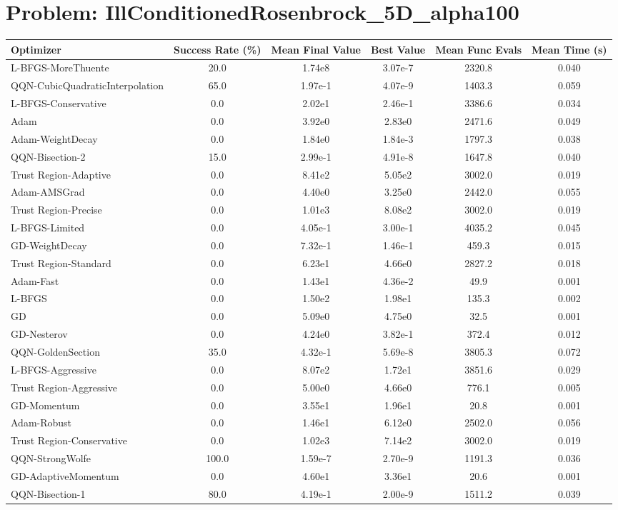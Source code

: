 \documentclass{article}
\begin{document}
\section{Problem: IllConditionedRosenbrock\_5D\_alpha100}
\begin{longtable}{p{3cm}*{5}{c}}
\toprule
\textbf{Optimizer} & \textbf{Success Rate (\%)} & \textbf{Mean Final Value} & \textbf{Best Value} & \textbf{Mean Func Evals} & \textbf{Mean Time (s)} \\
\midrule
L-BFGS-MoreThuente & 20.0 & 1.74e8 & 3.07e-7 & 2320.8 & 0.040 \\
QQN-CubicQuadraticInterpolation & 65.0 & 1.97e-1 & 4.07e-9 & 1403.3 & 0.059 \\
L-BFGS-Conservative & 0.0 & 2.02e1 & 2.46e-1 & 3386.6 & 0.034 \\
Adam & 0.0 & 3.92e0 & 2.83e0 & 2471.6 & 0.049 \\
Adam-WeightDecay & 0.0 & 1.84e0 & 1.84e-3 & 1797.3 & 0.038 \\
QQN-Bisection-2 & 15.0 & 2.99e-1 & 4.91e-8 & 1647.8 & 0.040 \\
Trust Region-Adaptive & 0.0 & 8.41e2 & 5.05e2 & 3002.0 & 0.019 \\
Adam-AMSGrad & 0.0 & 4.40e0 & 3.25e0 & 2442.0 & 0.055 \\
Trust Region-Precise & 0.0 & 1.01e3 & 8.08e2 & 3002.0 & 0.019 \\
L-BFGS-Limited & 0.0 & 4.05e-1 & 3.00e-1 & 4035.2 & 0.045 \\
GD-WeightDecay & 0.0 & 7.32e-1 & 1.46e-1 & 459.3 & 0.015 \\
Trust Region-Standard & 0.0 & 6.23e1 & 4.66e0 & 2827.2 & 0.018 \\
Adam-Fast & 0.0 & 1.43e1 & 4.36e-2 & 49.9 & 0.001 \\
L-BFGS & 0.0 & 1.50e2 & 1.98e1 & 135.3 & 0.002 \\
GD & 0.0 & 5.09e0 & 4.75e0 & 32.5 & 0.001 \\
GD-Nesterov & 0.0 & 4.24e0 & 3.82e-1 & 372.4 & 0.012 \\
QQN-GoldenSection & 35.0 & 4.32e-1 & 5.69e-8 & 3805.3 & 0.072 \\
L-BFGS-Aggressive & 0.0 & 8.07e2 & 1.72e1 & 3851.6 & 0.029 \\
Trust Region-Aggressive & 0.0 & 5.00e0 & 4.66e0 & 776.1 & 0.005 \\
GD-Momentum & 0.0 & 3.55e1 & 1.96e1 & 20.8 & 0.001 \\
Adam-Robust & 0.0 & 1.46e1 & 6.12e0 & 2502.0 & 0.056 \\
Trust Region-Conservative & 0.0 & 1.02e3 & 7.14e2 & 3002.0 & 0.019 \\
QQN-StrongWolfe & 100.0 & 1.59e-7 & 2.70e-9 & 1191.3 & 0.036 \\
GD-AdaptiveMomentum & 0.0 & 4.60e1 & 3.36e1 & 20.6 & 0.001 \\
QQN-Bisection-1 & 80.0 & 4.19e-1 & 2.00e-9 & 1511.2 & 0.039 \\
\bottomrule
\end{longtable}
\end{document}
